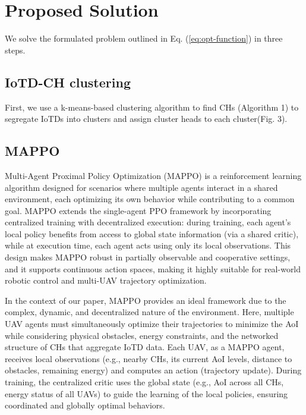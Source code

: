 \documentclass[conference]{IEEEtran}
\begin{document}
\section{Proposed Solution}
We solve the formulated problem outlined in Eq. (\ref{eq:opt-function}) in three steps. 
\subsection{IoTD-CH clustering}
First, we use a k-means-based clustering algorithm to find CHs (Algorithm 1) to segregate IoTDs into clusters and assign cluster heads to each cluster(Fig. 3).
\subsection{MAPPO}
Multi-Agent Proximal Policy Optimization (MAPPO) is a reinforcement learning algorithm designed for scenarios where multiple agents interact in a shared environment, each optimizing its own behavior while contributing to a common goal. MAPPO extends the single-agent PPO framework by incorporating centralized training with decentralized execution: during training, each agent’s local policy benefits from access to global state information (via a shared critic), while at execution time, each agent acts using only its local observations. This design makes MAPPO robust in partially observable and cooperative settings, and it supports continuous action spaces, making it highly suitable for real-world robotic control and multi-UAV trajectory optimization.

In the context of our paper, MAPPO provides an ideal framework due to the complex, dynamic, and decentralized nature of the environment. Here, multiple UAV agents must simultaneously optimize their trajectories to minimize the AoI while considering physical obstacles, energy constraints, and the networked structure of CHs that aggregate IoTD data. Each UAV, as a MAPPO agent, receives local observations (e.g., nearby CHs, its current AoI levels, distance to obstacles, remaining energy) and computes an action (trajectory update). During training, the centralized critic uses the global state (e.g., AoI across all CHs, energy status of all UAVs) to guide the learning of the local policies, ensuring coordinated and globally optimal behaviors.
\end{document}
